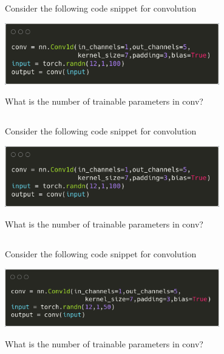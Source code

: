 \begin{frame}
\section{}
Consider the following code snippet for convolution

\includegraphics[width=0.7\textwidth]{images/quiz_4_4_4_1.png}

What is the number of trainable parameters in conv?


\end{frame}


\begin{frame}
\section{}
Consider the following code snippet for convolution

\includegraphics[width=0.7\textwidth]{images/quiz_4_4_4_2.png}

What is the number of trainable parameters in conv?


\end{frame}


\begin{frame}
\section{}
Consider the following code snippet for convolution

\includegraphics[width=0.7\textwidth]{images/quiz_4_4_4_3.png}

What is the number of trainable parameters in conv?


\end{frame}


